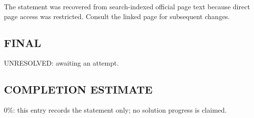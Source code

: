 The statement was recovered from search-indexed official page text because direct page access was restricted. Consult the linked page for subsequent changes.

\subsection*{FINAL}
UNRESOLVED: awaiting an attempt.

\subsection*{COMPLETION ESTIMATE}
$0\%$: this entry records the statement only; no solution progress is claimed.
